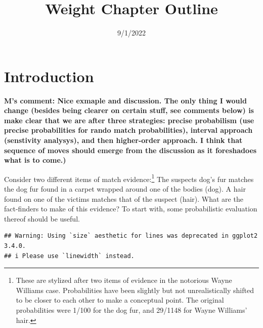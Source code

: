 \documentclass[
  10pt,
  dvipsnames,enabledeprecatedfontcommands]{scrartcl}
\title{Weight Chapter Outline}
\author{}
\date{\vspace{-2.5em}9/1/2022}
\begin{document}
\maketitle

{
\hypersetup{linkcolor=}
\setcounter{tocdepth}{2}
\tableofcontents
}
\hypertarget{introduction}{%
\section{Introduction}\label{introduction}}

\textbf{M's comment: Nice exmaple and discussion. The only thing I would change (besides being clearer on certain stuff, see comments below) is make clear that we are after three strategies: precise probabilism (use precise probabilities for rando match probabilities), interval approach (senstivity analysys), and then higher-order approach. I think that sequence of moves should emerge from the discussion as it foreshadoes what is to come.)}

Consider two different items of match evidence:\footnote{These are
  stylized after two items of evidence in the notorious Wayne Williams
  case. Probabilities have been slightly but not unrealistically shifted
  to be closer to each other to make a conceptual point. The original
  probabilities were 1/100 for the dog fur, and 29/1148 for Wayne
  Williams' hair.} The suspects dog's fur matches the dog fur found in a
carpet wrapped around one of the bodies (\textsf{dog}). A hair found on
one of the victims matches that of the suspect (\textsf{hair}). What are
the fact-finders to make of this evidence? To start with, some
probabilistic evaluation thereof should be useful.

\begin{verbatim}
## Warning: Using `size` aesthetic for lines was deprecated in ggplot2 3.4.0.
## i Please use `linewidth` instead.
\end{verbatim}
\end{document}
